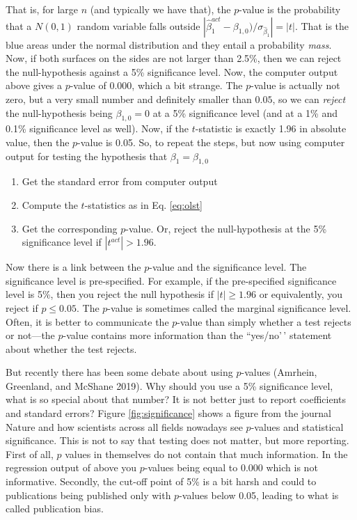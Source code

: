 \documentclass[
]{book}
\providecommand{\tightlist}{%
  \setlength{\itemsep}{0pt}\setlength{\parskip}{0pt}}
\begin{document}
That is, for large \(n\) (and typically we have that), the \(p\)-value is the probability that a \(N(0,1)\) random variable falls outside \(|\hat{\beta}_1^{act} - \beta_{1,0})/\sigma_{\hat{\beta}_1} | = |t|\). That is the blue areas under the normal distribution and they entail a probability \emph{mass}. Now, if both surfaces on the sides are not larger than 2.5\%, then we can reject the null-hypothesis against a 5\% significance level. Now, the computer output above gives a \(p\)-value of \(0.000\), which a bit strange. The \(p\)-value is actually not zero, but a very small number and definitely smaller than \(0.05\), so we can \emph{reject} the null-hypothesis being \(\beta_{1,0} = 0\) at a 5\% significance level (and at a 1\% and 0.1\% significance level as well). Now, if the \(t\)-statistic is exactly 1.96 in absolute value, then the \(p\)-value is 0.05. So, to repeat the steps, but now using computer output for testing the hypothesis that \(\beta_1 = \beta_{1,0}\)

\begin{enumerate}
\def\labelenumi{\arabic{enumi}.}
\tightlist
\item
  Get the standard error from computer output
\item
  Compute the \(t\)-statistics as in Eq. \eqref{eq:olst}
\item
  Get the corresponding \(p\)-value. Or, reject the null-hypothesis at the 5\% significance level if \(|t^{act}| > 1.96\).
\end{enumerate}

Now there is a link between the \(p\)-value and the significance level. The significance level is pre-specified. For example, if the pre-specified significance level is 5\%, then you reject the null hypothesis if \(|t| \geq 1.96\) or equivalently, you reject if \(p \leq 0.05\). The \(p\)-value is sometimes called the marginal significance level. Often, it is better to communicate the \(p\)-value than simply whether a test rejects or not---the \(p\)-value contains more information than the ``yes/no'\,' statement about whether the test rejects.

But recently there has been some debate about using \(p\)-values (Amrhein, Greenland, and McShane 2019). Why should you use a 5\% significance level, what is so special about that number? It is not better just to report coefficients and standard errors? Figure \ref{fig:significance} shows a figure from the journal Nature and how scientists across all fields nowadays see \(p\)-values and statistical significance. This is not to say that testing does not matter, but more reporting. First of all, \(p\) values in themselves do not contain that much information. In the regression output of above you \(p\)-values being equal to 0.000 which is not informative. Secondly, the cut-off point of 5\% is a bit harsh and could to publications being published only with \(p\)-values below 0.05, leading to what is called publication bias.
\end{document}
